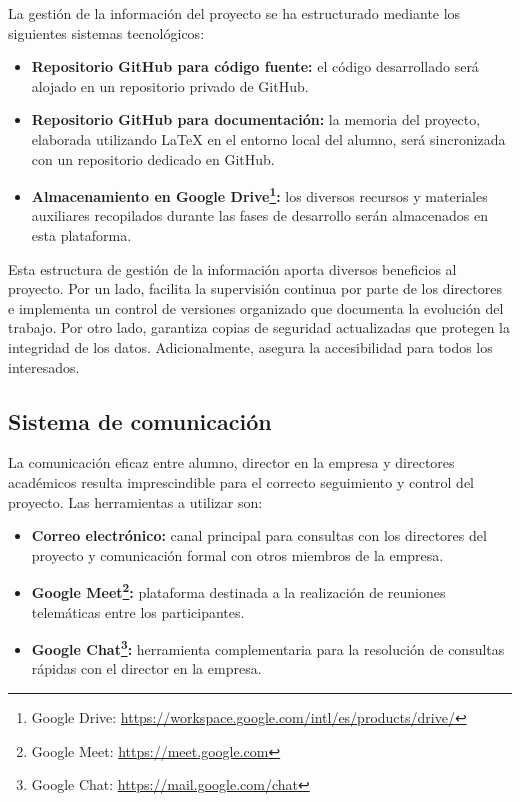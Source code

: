 La gestión de la información del proyecto se ha estructurado mediante los siguientes sistemas tecnológicos:
\begin{itemize}
\item \textbf{Repositorio GitHub para código fuente:} el código desarrollado será alojado en un repositorio privado de GitHub.
\item \textbf{Repositorio GitHub para documentación:} la memoria del proyecto, elaborada utilizando LaTeX en el entorno local del alumno, será sincronizada con un repositorio dedicado en GitHub.
\item \textbf{Almacenamiento en Google Drive\footnote{Google Drive: \url{https://workspace.google.com/intl/es/products/drive/}}:} los diversos recursos y materiales auxiliares recopilados durante las fases de desarrollo serán almacenados en esta plataforma.
\end{itemize}
Esta estructura de gestión de la información aporta diversos beneficios al proyecto. Por un lado, facilita la supervisión continua por parte de los directores e implementa un control de versiones organizado que documenta la evolución del trabajo. Por otro lado, garantiza copias de seguridad actualizadas que protegen la integridad de los datos. Adicionalmente, asegura la accesibilidad para todos los interesados.

\subsection{Sistema de comunicación}
La comunicación eficaz entre alumno, director en la empresa y directores académicos resulta imprescindible para el correcto seguimiento y control del proyecto. Las herramientas a utilizar son:
\begin{itemize}
\item\textbf{Correo electrónico: }canal principal para consultas con los directores del proyecto y comunicación formal con otros miembros de la empresa.
\item\textbf{Google Meet\footnote{Google Meet: \url{https://meet.google.com}}: }plataforma destinada a la realización de reuniones telemáticas entre los participantes.
\item\textbf{Google Chat\footnote{Google Chat: \url{https://mail.google.com/chat}}: }herramienta complementaria para la resolución de consultas rápidas con el director en la empresa.
\end{itemize}

